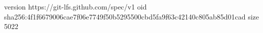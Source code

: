 version https://git-lfs.github.com/spec/v1
oid sha256:4f1f6679006cae7f06e7749f50b5295500cbd5fa9f63c42140c805ab85d01cad
size 5022
